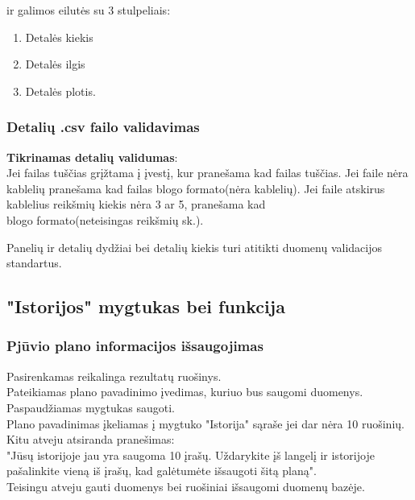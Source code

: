 \documentclass[a4paper,12pt]{article}
\begin{document}
ir galimos eilutės su 3 stulpeliais:
\begin{enumerate}
	\item Detalės kiekis
	\item Detalės ilgis
	\item Detalės plotis.
\end{enumerate}

\subsubsection{Detalių .csv failo validavimas}
\textbf{Tikrinamas detalių validumas}:\\
	Jei failas tuščias grįžtama į įvestį, kur pranešama kad failas tuščias.
	Jei faile nėra kablelių pranešama kad failas blogo formato(nėra kablelių).
	Jei faile atskirus kablelius reikšmių kiekis nėra 3 ar 5, pranešama kad \\
	blogo formato(neteisingas reikšmių sk.). 
		
	Panelių ir detalių dydžiai bei detalių kiekis turi atitikti duomenų validacijos standartus.\\


\subsection{"Istorijos" mygtukas bei funkcija}

\subsubsection{Pjūvio plano informacijos išsaugojimas}
Pasirenkamas reikalinga rezultatų ruošinys. \\
Pateikiamas plano pavadinimo įvedimas, kuriuo bus saugomi duomenys. \\
Paspaudžiamas mygtukas saugoti. \\
Plano pavadinimas įkeliamas į mygtuko "Istorija" sąraše jei dar nėra 10 ruošinių.\\
Kitu atveju atsiranda pranešimas: \\
"Jūsų istorijoje jau yra saugoma 10 įrašų. Uždarykite įš langelį ir istorijoje pašalinkite vieną iš įrašų, kad galėtumėte išsaugoti šitą planą". \\
Teisingu atveju gauti duomenys bei ruošiniai išsaugomi duomenų bazėje.
\end{document}
